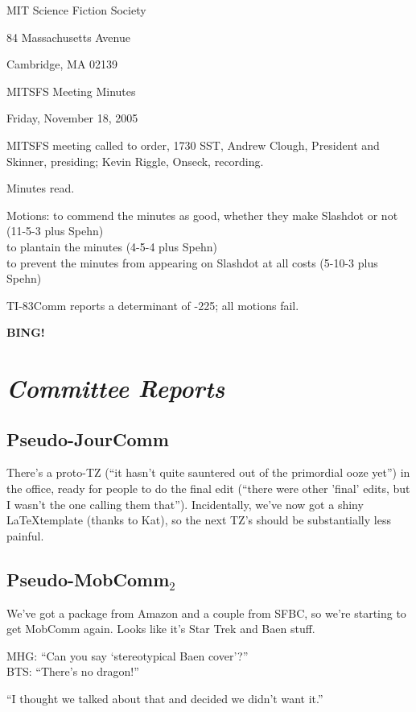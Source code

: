 \documentclass[10pt]{article}
\newcommand{\bing}{{\bf BING!} }
\newcommand{\goto}[1]{\bing \vskip 12pt \section*{{\em{#1}}}}
\newcommand{\ps}{ plus Spehn\xspace}
\begin{document}
\begin{center}

MIT Science Fiction Society

84 Massachusetts Avenue

Cambridge, MA 02139

\vspace{12pt}

MITSFS Meeting Minutes

Friday, November 18, 2005

\end{center}

\vspace{18pt}

\setlength{\parskip}{6pt}

\noindent
MITSFS meeting called to order, 1730 SST, Andrew Clough, President and 
Skinner, presiding; Kevin Riggle,  Onseck, recording.

Minutes read.

Motions: to commend the minutes as good, whether they make Slashdot or not (11-5-3\ps) \\
to plantain the minutes (4-5-4\ps) \\
to prevent the minutes from appearing on Slashdot at all costs (5-10-3\ps)

TI-83Comm reports a determinant of -225; all motions fail.

\goto{Committee Reports}
\subsection*{Pseudo-JourComm}
There's a proto-TZ (``it hasn't quite sauntered out of the primordial ooze yet'') in the office,
ready for people to do the final edit (``there were other 'final' edits, but I wasn't the one calling
them that'').  Incidentally, we've now got a shiny \LaTeX template (thanks to Kat), so the next
TZ's should be substantially less painful.

\subsection*{Pseudo-MobComm$_2$}
We've got a package from Amazon and a couple from SFBC, so we're starting to get MobComm again.
Looks like it's Star Trek and Baen stuff.

MHG: ``Can you say `stereotypical Baen cover'?''\\
BTS: ``There's no dragon!''

``I thought we talked about that and decided we didn't want it.''
\end{document}
